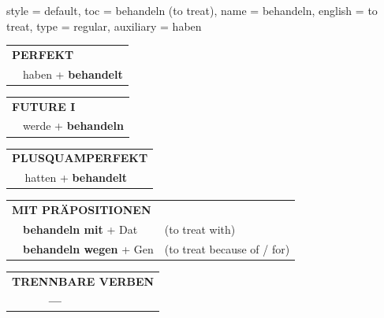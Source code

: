 \begin{verbentry}{
  style = {default},
  toc = {behandeln (to treat)},
  name = {behandeln},
  english = {to treat},
  type = {regular},
  auxiliary = {haben}
}
 \begin{tabular}{rl}
     \multicolumn{2}{l}{\textbf{PERFEKT}}\\
   & haben + \textbf{behandelt}\\
  \end{tabular}
\hfill
   \begin{tabular}{rl}
    \multicolumn{2}{l}{\textbf{FUTURE I} }\\
   & werde + \textbf{behandeln}\\
  \end{tabular}
\hfill
   \begin{tabular}{rl}
      \multicolumn{2}{l}{\textbf{PLUSQUAMPERFEKT}}\\
   & hatten + \textbf{behandelt}\\
  \end{tabular}

   \vspace{10pt}

   \begin{tabular}{lll}
      \multicolumn{3}{l}{\textbf{MIT PRÄPOSITIONEN}}\\
& \textbf{behandeln mit} + Dat & (to treat with)\\
& \textbf{behandeln wegen} + Gen & (to treat because of / for)\\
\end{tabular}
  \hfill
   \begin{tabular}{lll}
\multicolumn{3}{l}{\textbf{TRENNBARE VERBEN}}\\
& \textbf{---} & \\
\end{tabular}

  \vspace{-5pt}
\end{verbentry}

